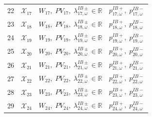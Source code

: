 \documentclass{article}
\begin{document}
\begin{longtable}{c p{5.5cm} p{4.2cm} p{3.8cm}}
22  & $\mathcal{X}_{17}$
    & $W_{17},\;PV_{17},\;\lambda^{IB\pm}_{17,\omega} \in \mathbb{R}$
    & $p^{IB+}_{17,\omega},\; p^{IB-}_{17,\omega}$ \\

23  & $\mathcal{X}_{18}$
    & $W_{18},\;PV_{18},\;\lambda^{IB\pm}_{18,\omega} \in \mathbb{R}$
    & $p^{IB+}_{18,\omega},\; p^{IB-}_{18,\omega}$ \\

24  & $\mathcal{X}_{19}$
    & $W_{19},\;PV_{19},\;\lambda^{IB\pm}_{19,\omega} \in \mathbb{R}$
    & $p^{IB+}_{19,\omega},\; p^{IB-}_{19,\omega}$ \\

25  & $\mathcal{X}_{20}$
    & $W_{20},\;PV_{20},\;\lambda^{IB\pm}_{20,\omega} \in \mathbb{R}$
    & $p^{IB+}_{20,\omega},\; p^{IB-}_{20,\omega}$ \\

26  & $\mathcal{X}_{21}$
    & $W_{21},\;PV_{21},\;\lambda^{IB\pm}_{21,\omega} \in \mathbb{R}$
    & $p^{IB+}_{21,\omega},\; p^{IB-}_{21,\omega}$ \\

27  & $\mathcal{X}_{22}$
    & $W_{22},\;PV_{22},\;\lambda^{IB\pm}_{22,\omega} \in \mathbb{R}$
    & $p^{IB+}_{22,\omega},\; p^{IB-}_{22,\omega}$ \\

28  & $\mathcal{X}_{23}$
    & $W_{23},\;PV_{23},\;\lambda^{IB\pm}_{23,\omega} \in \mathbb{R}$
    & $p^{IB+}_{23,\omega},\; p^{IB-}_{23,\omega}$ \\

29  & $\mathcal{X}_{24}$
    & $W_{24},\;PV_{24},\;\lambda^{IB\pm}_{24,\omega} \in \mathbb{R}$
    & $p^{IB+}_{24,\omega},\; p^{IB-}_{24,\omega}$ \\

\end{longtable}



\printbibliography
\end{document}
